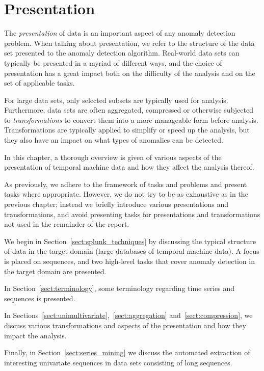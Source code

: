 \chapter{Presentation}
\label{ch:transformations}

The \emph{presentation} of data is an important aspect of any anomaly detection problem. When talking about presentation, we refer to the structure of the data set presented to the anomaly detection algorithm. Real-world data sets can typically be presented in a myriad of different ways, and the choice of presentation has a great impact both on the difficulty of the analysis and on the set of applicable tasks.

For large data sets, only selected subsets are typically used for analysis. Furthermore, data sets are often aggregated, compressed or otherwise subjected to \emph{transformations} to convert them into a more manageable form before analysis. Transformations are typically applied to simplify or speed up the analysis, but they also have an impact on what types of anomalies can be detected.

In this chapter, a thorough overview is given of various aspects of the presentation of temporal machine data and how they affect the analysis thereof.

As previously, we adhere to the framework of tasks and problems and present tasks where appropriate. However, we do not try to be as exhaustive as in the previous chapter; instead we briefly introduce various presentations and transformations, and avoid presenting tasks for presentations and transformations not used in the remainder of the report.

We begin in Section~\ref{sect:splunk_techniques} by discussing the typical structure of data in the target domain (large databases of temporal machine data). A focus is placed on sequences, and two high-level tasks that cover anomaly detection in the target domain are presented.

In Section~\ref{sect:terminology}, some terminology regarding time series and sequences is presented.

In Sections~\ref{sect:unimultivariate},~\ref{sect:aggregation} and~\ref{sect:compression}, we discuss various transformations and aspects of the presentation and how they impact the analysis.

Finally, in Section~\ref{sect:series_mining} we discuss the automated extraction of interesting univariate sequences in data sets consisting of long sequences.

